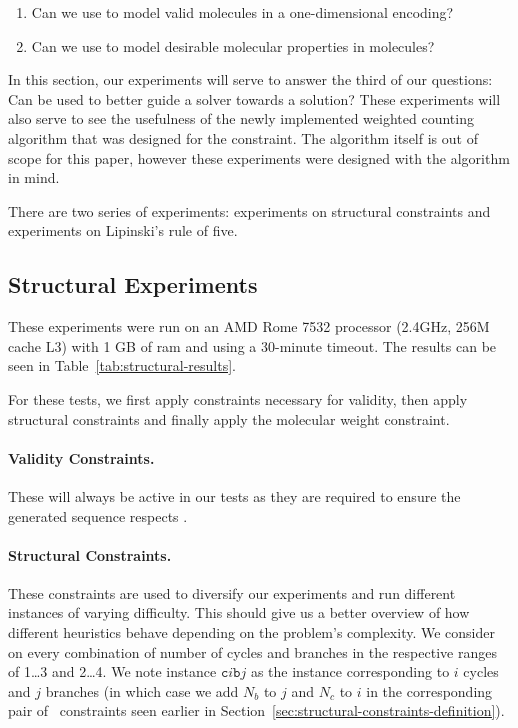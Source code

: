 \documentclass[../Document.tex]{subfiles}
\begin{document}
\begin{enumerate}
    \item Can we use \cp to model valid molecules in a one-dimensional encoding?
    \item Can we use \cp to model desirable molecular properties in \smiles molecules?
\end{enumerate}

In this section, our experiments will serve to answer the third of our questions: Can \bp be used to better guide a solver towards a solution?
These experiments will also serve to see the usefulness of the newly implemented weighted counting algorithm that was designed for the \grammar constraint.
The algorithm itself is out of scope for this paper, however these experiments were designed with the algorithm in mind.

There are two series of experiments: experiments on structural constraints and experiments on Lipinski's rule of five.

\subsection{Structural Experiments}
These experiments were run on an AMD Rome 7532 processor (2.4GHz, 256M cache L3) with 1 GB of \gls{ram} and using a 30-minute timeout. The results can be seen in Table~\ref{tab:structural-results}.

For these tests, we first apply constraints necessary for validity, then apply structural constraints and finally apply the molecular weight constraint.

\paragraph{Validity Constraints.} These will always be active in our tests as they are required to ensure the generated sequence respects \smiles.

\paragraph{Structural Constraints.} These constraints are used to diversify our experiments and run different instances of varying difficulty. This should give us a better overview of how different heuristics behave depending on the problem's complexity. We consider on every combination of number of cycles and branches in the respective ranges of 1\ldots3 and 2\ldots4. We note instance $\mathtt{c}i\mathtt{b}j$ as the instance corresponding to $i$ cycles and $j$ branches (in which case we add $N_b$ to $j$ and $N_c$ to $i$ in the corresponding pair of \among\ constraints seen earlier in Section~\ref{sec:structural-constraints-definition}).
\end{document}
